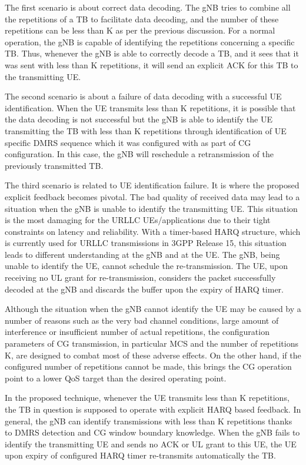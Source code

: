 \documentclass[conference]{IEEEtran}
\begin{document}
The first scenario is about correct data decoding. The gNB tries to combine all the repetitions of a TB to facilitate data decoding, and the number of these repetitions can be less than K as per the previous discussion. For a normal operation, the gNB is capable of identifying the repetitions concerning a specific TB. Thus, whenever the gNB is able to correctly decode a TB, and it sees that it was sent with less than K repetitions, it will send an explicit ACK for this TB to the transmitting UE.

The second scenario is about a failure of data decoding with a successful UE identification. When the UE transmits less than K repetitions, it is possible that the data decoding is not successful but the gNB is able to identify the UE transmitting the TB with less than K repetitions through identification of UE specific DMRS sequence which it was configured with as part of CG configuration. In this case, the gNB will reschedule a retransmission of the previously transmitted TB. 

The third scenario is related to UE identification failure. It is where the proposed explicit feedback becomes pivotal. The bad quality of received data may lead to a situation when the gNB is unable to identify the transmitting UE. This situation is the most damaging for the URLLC UEs/applications due to their tight constraints on latency and reliability. With a timer-based HARQ structure, which is currently used for URLLC transmissions in 3GPP Release 15, this situation leads to different understanding at the gNB and at the UE. The gNB, being unable to identify the UE, cannot schedule the re-transmission. The UE, upon receiving no UL grant for re-transmission, considers the packet successfully decoded at the gNB and discards the buffer upon the expiry of HARQ timer.

Although the situation when the gNB cannot identify the UE may be caused by a number of reasons such as the very bad channel conditions, large amount of interference or insufficient number of actual repetitions, the configuration parameters of CG transmission, in particular MCS and the number of repetitions K, are designed to combat most of these adverse effects. On the other hand, if the configured number of repetitions cannot be made, this brings the CG operation point to a lower QoS target than the desired operating point.

In the proposed technique, whenever the UE transmits less than K repetitions, the TB in question is supposed to operate with explicit HARQ based feedback. In general, the gNB can identify transmissions with less than K repetitions thanks to DMRS detection and CG window boundary knowledge. When the gNB fails to identify the transmitting UE and sends no ACK or UL grant to this UE, the UE upon expiry of configured HARQ timer re-transmits automatically the TB. 
\end{document}
